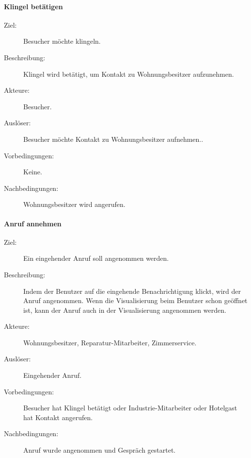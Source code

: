 \paragraph{Klingel betätigen}
    \begin{description}
        \item[Ziel:] Besucher möchte klingeln.
        \item[Beschreibung:] Klingel wird betätigt, um Kontakt zu Wohnungsbesitzer aufzunehmen.
        \item[Akteure:] Besucher.
        \item[Auslöser:] Besucher möchte Kontakt zu Wohnungsbesitzer aufnehmen..
        \item[Vorbedingungen:] Keine.
        \item[Nachbedingungen:] Wohnungsbesitzer wird angerufen.
    \end{description}

\paragraph{Anruf annehmen}
    \begin{description}
        \item[Ziel:] Ein eingehender Anruf soll angenommen werden.
        \item[Beschreibung:] Indem der Benutzer auf die eingehende Benachrichtigung klickt, wird der Anruf angenommen.
            Wenn die Visualisierung beim Benutzer schon geöffnet ist, kann der Anruf auch in der Visualisierung angenommen werden.
        \item[Akteure:] Wohnungsbesitzer, Reparatur-Mitarbeiter, Zimmerservice.
        \item[Auslöser:] Eingehender Anruf.
        \item[Vorbedingungen:] Besucher hat Klingel betätigt oder Industrie-Mitarbeiter oder Hotelgast hat Kontakt angerufen.
        \item[Nachbedingungen:] Anruf wurde angenommen und Gespräch gestartet.
    \end{description}


